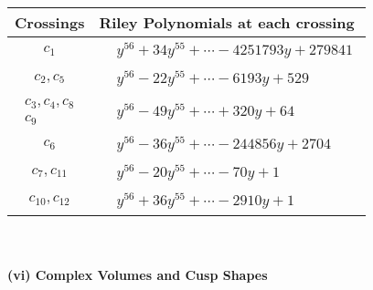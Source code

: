\documentclass[1p]{elsarticle_modified}
\theoremstyle{definition}
\begin{document}
\begin{tabular}{m{50pt}|m{274pt}}
Crossings & \hspace{64pt}Riley Polynomials at each crossing \\
\hline $$\begin{aligned}c_{1}\end{aligned}$$&$\begin{aligned}
&y^{56}+34 y^{55}+\cdots-4251793 y+279841
\end{aligned}$\\
\hline $$\begin{aligned}c_{2},c_{5}\end{aligned}$$&$\begin{aligned}
&y^{56}-22 y^{55}+\cdots-6193 y+529
\end{aligned}$\\
\hline $$\begin{aligned}c_{3},c_{4},c_{8}\\c_{9}\end{aligned}$$&$\begin{aligned}
&y^{56}-49 y^{55}+\cdots+320 y+64
\end{aligned}$\\
\hline $$\begin{aligned}c_{6}\end{aligned}$$&$\begin{aligned}
&y^{56}-36 y^{55}+\cdots-244856 y+2704
\end{aligned}$\\
\hline $$\begin{aligned}c_{7},c_{11}\end{aligned}$$&$\begin{aligned}
&y^{56}-20 y^{55}+\cdots-70 y+1
\end{aligned}$\\
\hline $$\begin{aligned}c_{10},c_{12}\end{aligned}$$&$\begin{aligned}
&y^{56}+36 y^{55}+\cdots-2910 y+1
\end{aligned}$\\
\hline
\end{tabular}\\~\\
\newpage\flushleft \textbf{(vi) Complex Volumes and Cusp Shapes}
\end{document}
